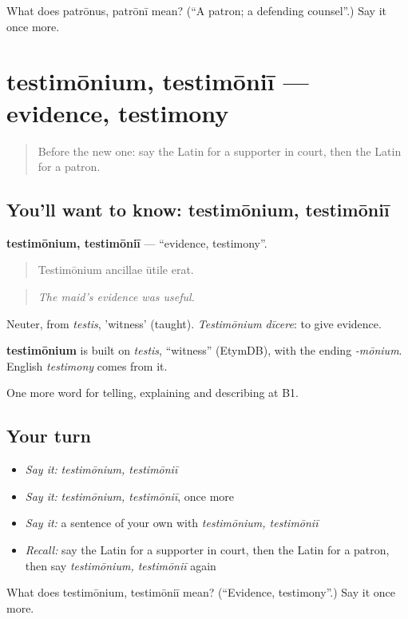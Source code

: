 \begin{tcolorbox}[breakable,colback=teal!4,colframe=teal!35!black,title={Before you move on}]
What does patrōnus, patrōnī mean? (\textquotedblleft{}A patron; a defending counsel\textquotedblright{}.) Say it once more.
\end{tcolorbox}
\section[testimōnium, testimōniī]{testimōnium, testimōniī — evidence, testimony}

\label{lesson:LA-C309-testimonium}



\begin{quote}
Before the new one: say the Latin for a supporter in court, then the Latin for a patron.
\end{quote}

\subsection*{You'll want to know: testimōnium, testimōniī}
\textbf{testimōnium, testimōniī} — \textquotedblleft{}evidence, testimony\textquotedblright{}.

\begin{quote}
Testimōnium ancillae ūtile erat.
\end{quote}

\begin{quote}
\emph{The maid's evidence was useful.}
\end{quote}

Neuter, from \emph{testis}, 'witness' (taught). \emph{Testimōnium dīcere}: to give evidence.

\begin{cousinweb}
\textbf{testimōnium} is built on \emph{testis}, \textquotedblleft{}witness\textquotedblright{} (EtymDB), with the ending \emph{-mōnium}. English \emph{testimony} comes from it.
\end{cousinweb}

\begin{grammarlens}[title={What you've built}]
One more word for telling, explaining and describing at B1.
\end{grammarlens}

\subsection*{Your turn}
\begin{itemize}
\raggedright
  \item \emph{Say it:} \emph{testimōnium, testimōniī}
  \item \emph{Say it:} \emph{testimōnium, testimōniī}, once more
  \item \emph{Say it:} a sentence of your own with \emph{testimōnium, testimōniī}
  \item \emph{Recall:} say the Latin for a supporter in court, then the Latin for a patron, then say \emph{testimōnium, testimōniī} again
\end{itemize}

\begin{tcolorbox}[breakable,colback=teal!4,colframe=teal!35!black,title={Before you move on}]
What does testimōnium, testimōniī mean? (\textquotedblleft{}Evidence, testimony\textquotedblright{}.) Say it once more.
\end{tcolorbox}
